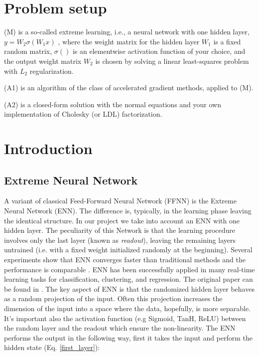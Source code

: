\section{Problem setup}
(M) is a so-called extreme learning, i.e., a neural network with one hidden layer, $y=W_2\sigma(W_1x)$ , where the weight matrix for the hidden layer $W_1$ is a fixed random matrix, $\sigma()$ is an elementwise activation function of your choice, and the output weight matrix $W_2$ is chosen by solving a linear least-squares problem with $L_2$ regularization.

(A1) is an algorithm of the class of accelerated gradient methods, applied to (M).

(A2) is a closed-form solution with the normal equations and your own implementation of Cholesky (or LDL) factorization.

\section{Introduction}

\subsection{Extreme Neural Network}
A variant of classical Feed-Forward Neural Network (FFNN) is the Extreme Neural Network (ENN). The difference is, typically, in the learning phase leaving the identical structure. In our project we take into account an ENN with one hidden layer. The peculiarity of this Network is that the learning procedure involves only the last layer (known as \textit{readout}), leaving the remaining layers untrained (i.e. with a fixed weight initialized randomly at the beginning). Several experiments show that ENN converges faster than traditional methods and the performance is comparable \cite{huang2004extreme}. ENN has been successfully applied in many real-time learning tasks for classification, clustering, and regression. The original paper can be found in \cite{huang2004extreme}. The key aspect of ENN is that the randomized hidden layer behaves as a random projection of the input. Often this projection increases the dimension of the input into a space where the data, hopefully, is more separable. It's important also the activation function (e.g Sigmoid, TanH, ReLU) between the random layer and the readout which ensure the non-linearity. The ENN performs the output in the following way, first it takes the input and perform the hidden state (Eq. \ref{first_layer}):

